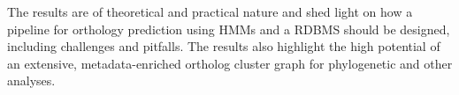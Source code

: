 The results are of theoretical and practical nature and shed light on how a
pipeline for orthology prediction using HMMs and a RDBMS should be designed,
including challenges and pitfalls. 
The results also highlight the high potential of an extensive, metadata-enriched
ortholog cluster graph for phylogenetic and other analyses. 
